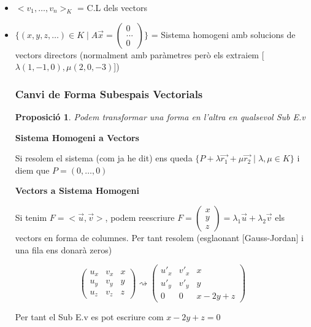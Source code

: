 \documentclass[12pt]{article}
\newtheorem{proposicio}{Proposició}[section]
\begin{document}
\begin{itemize}
    \item $<v_1, \dots, v_n>_K$ = C.L dels vectors
    \item $\{(x,y,z,\dots)\in K \mid A\vec{x} = \begin{pmatrix}
    0\\
    ...\\
    0
    \end{pmatrix}\}$ = Sistema homogeni amb solucions de vectors directors (normalment amb paràmetres però els extraiem [$\lambda(1,-1,0), \mu(2,0,-3)$])

    \subsubsection{Canvi de Forma Subespais Vectorials}
    
    \begin{proposicio}
        Podem transformar una forma en l'altra en qualsevol Sub E.v
    \end{proposicio}

    \textbf{Sistema Homogeni a Vectors}

    Si resolem el sistema (com ja he dit) ens queda $\{P + \lambda \vec{r_1} + \mu \vec{r_2} \mid \lambda, \mu\in K\}$ i diem que $P = (0,\dots,0)$

    \textbf{Vectors a Sistema Homogeni}

    Si tenim $F = <\vec{u}, \vec{v}>$, podem reescriure $F = \begin{pmatrix}
        x\\
        y\\
        z
    \end{pmatrix} = \lambda_1 \vec{u} + \lambda_2 \vec{v}$ els vectors en forma de columnes. Per tant resolem (esglaonant [Gauss-Jordan] i una fila ens donarà zeros)

    \[\begin{pmatrix}
        u_x & v_x & x\\
        u_y & v_y & y\\
        u_z & v_z & z
    \end{pmatrix}\rightsquigarrow \begin{pmatrix}
        u'_x & v'_x & x\\
        u'_y & v'_y & y\\
        0 & 0 & x-2y+z
    \end{pmatrix}\]

    Per tant el Sub E.v es pot escriure com $x-2y+z = 0$

\end{itemize}
\end{document}
